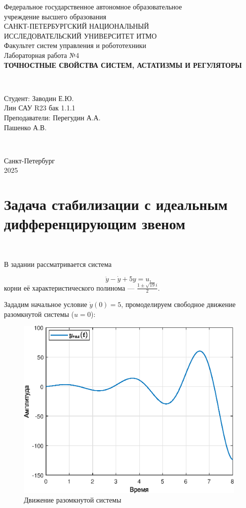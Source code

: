 \documentclass[a4paper]{article}
\begin{document}
\begin{titlepage}
    \begin{center}
        Федеральное государственное автономное образовательное \\ учреждение высшего образования \\[6pt]
        САНКТ-ПЕТЕРБУРГСКИЙ НАЦИОНАЛЬНЫЙ \\ ИССЛЕДОВАТЕЛЬСКИЙ УНИВЕРСИТЕТ ИТМО \\[16pt]
        Факультет систем управления и робототехники \\[26em]
        Лабораторная работа №4\\[0.5em]
        \textbf{ТОЧНОСТНЫЕ СВОЙСТВА СИСТЕМ, АСТАТИЗМЫ И РЕГУЛЯТОРЫ}
    \end{center}\,\\[10em]
    \begin{flushright}
        Студент: Заводин Е.Ю.\\
        Лин САУ R23 бак 1.1.1 \\[0.5em]
        Преподаватели: Перегудин А.А.\\
        Пашенко А.В.
    \end{flushright}\,\\[6em]
    \begin{center}
        {\small Санкт-Петербург \\ 2025}
    \end{center}
\end{titlepage}
\setcounter{page}{2}
\tableofcontents\newpage

\section{Задача стабилизации с идеальным дифференцирующим звеном}\

В задании рассматривается система 

$$\ddot{y}-\dot{y}+5y=u,$$
корни её характеристического полинома --- $\frac{1\pm\sqrt{19}i}{2}$.\ 

Зададим начальное условие $\dot{y}(0)=5$, промоделируем свободное движение разомкнутой системы ($u=0$):

\begin{figure}[H]
    \centering
    \includegraphics[width=0.6\linewidth]{ex1/razomk_fig.eps}
    \caption{Движение разомкнутой системы}
\end{figure}\
\end{document}
